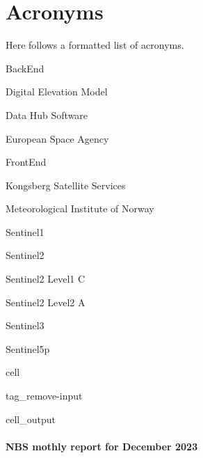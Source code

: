 \documentclass[letterpaper,10pt,english]{jupyterBook}
\begin{document}
\sphinxstepscope


\chapter{Acronyms}
\label{\detokenize{acronyms:acronyms}}\label{\detokenize{acronyms::doc}}
\sphinxAtStartPar
Here follows a formatted list of acronyms.

\sphinxAtStartPar
{}
BackEnd

\sphinxAtStartPar
{}
Digital Elevation Model

\sphinxAtStartPar
{}
Data Hub Software

\sphinxAtStartPar
{}
European Space Agency

\sphinxAtStartPar
{}
FrontEnd

\sphinxAtStartPar
{}
Kongsberg Satellite Services

\sphinxAtStartPar
{}
Meteorological Institute of Norway

\sphinxAtStartPar
{}
Sentinel\sphinxhyphen{}1

\sphinxAtStartPar
{}
Sentinel\sphinxhyphen{}2

\sphinxAtStartPar
{}
Sentinel\sphinxhyphen{}2 Level\sphinxhyphen{}1 C

\sphinxAtStartPar
{}
Sentinel\sphinxhyphen{}2 Level\sphinxhyphen{}2 A

\sphinxAtStartPar
{}
Sentinel\sphinxhyphen{}3

\sphinxAtStartPar
{}
Sentinel\sphinxhyphen{}5p

\sphinxstepscope

\begin{sphinxuseclass}{cell}
\begin{sphinxuseclass}{tag_remove-input}\begin{sphinxVerbatimOutput}

\begin{sphinxuseclass}{cell_output}\subsubsection*{NBS mothly report for December 2023}

\end{sphinxuseclass}\end{sphinxVerbatimOutput}

\end{sphinxuseclass}
\end{sphinxuseclass}
\end{document}
